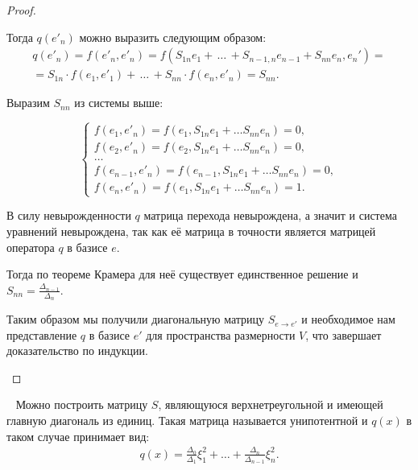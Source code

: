 \begin{proof}
\begin{enumerate}
        Тогда $q(e'_n)$ можно выразить следующим образом: \begin{gather*}
            q(e'_n) = f(e'_n, e'_n) = f(S_{1n} e_1 + \, \dots \, + S_{n-1, n} e_{n-1} + S_{nn}e_n, e_n') = \\
            = S_{1n} \cdot f(e_1, e'_1) + \, \dots \, + S_{nn} \cdot f(e_n, e'_n) = S_{nn}. 
        \end{gather*}  
        
        Выразим $S_{nn}$ из системы выше:

        \begin{equation*}
            \begin{cases}
                f(e_1, e'_n) = f(e_1, S_{1n}e_1 + \dots S_{nn}e_n) = 0,         \\
                f(e_2, e'_n) = f(e_2, S_{1n}e_1 + \dots S_{nn}e_n) = 0,         \\
                \dots                                                           \\
                f(e_{n-1}, e'_n) = f(e_{n-1}, S_{1n}e_1 + \dots S_{nn}e_n) = 0, \\
                f(e_n, e'_n) = f(e_1, S_{1n}e_1 + \dots S_{nn}e_n) = 1.
            \end{cases}
        \end{equation*}

        В силу невырожденности $q$ матрица перехода невырождена, а значит и система уравнений невырождена,
        так как её матрица в точности является матрицей оператора $q$ в базисе $e$.
        
        Тогда по теореме Крамера для неё существует единственное решение и $S_{nn} = \frac{\Delta_{n-1}}{\Delta_n}$.

        Таким образом мы получили диагональную матрицу $S_{e \to e'}$ и необходимое нам представление 
        $q$ в базисе $e'$ для пространства размерности $V$, что завершает доказательство по индукции.
    \end{enumerate} 
\end{proof}

\begin{note}[О модификациях]~
    Можно построить матрицу $S$, являющуюся верхнетреугольной и имеющей главную диагональ из единиц. 
    Такая матрица называется унипотентной и $q(x)$ в таком случае принимает вид: 
    \begin{gather*}
        q(x) = \frac{\Delta_0}{\Delta_1} \xi_1^2 + \dots + \frac{\Delta_n}{\Delta_{n-1}} \xi_n^2.
    \end{gather*}
\end{note}

